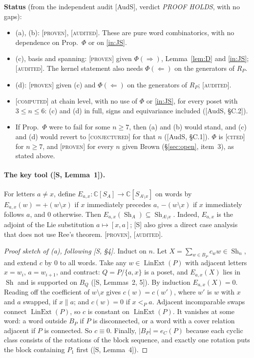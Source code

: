 \documentclass[11pt]{article}
\theoremstyle{definition}
\theoremstyle{remark}
\newcommand{\Lin}{\operatorname{LinExt}}
\newcommand{\Sh}{\operatorname{Sh}}
\newcommand{\st}[1]{\textup{[\textsc{#1}]}}
\begin{document}
\noindent\textbf{Status} (from the independent audit [AudS], verdict
\emph{PROOF HOLDS}, with no gaps):
\begin{itemize}[nosep]
\item (a), (b): \st{proven}, \st{audited}. These are pure word
  combinatorics, with no dependence on Prop.~$\Phi$ or on \ref{in:JS}.
\item (c), basis and spanning: \st{proven} given $\Phi(\Rightarrow)$,
  Lemma~\ref{lem:D} and \ref{in:JS}; \st{audited}. The kernel statement also
  needs $\Phi(\Leftarrow)$ on the generators of $R_P$.
\item (d): \st{proven} given (c) and $\Phi(\Leftarrow)$ on the generators of
  $R_P$; \st{audited}.
\item \st{computed} at chain level, with no use of $\Phi$ or \ref{in:JS},
  for every poset with $3\le n\le6$: (c) and (d) in full, signs and
  equivariance included ([AudS, \S C.2]).
\item If Prop.~$\Phi$ were to fail for some $n\ge7$, then (a) and (b) would
  stand, and (c) and (d) would revert to \st{conjectured} for that $n$
  ([AudS, \S C.1]). $\Phi$ is \st{cited} for $n\ge7$, and \st{proven} for
  every $n$ given Brown (\S\ref{sec:open}, item~3), as stated above.
\end{itemize}

\paragraph{The key tool ([S, Lemma~1]).} For letters $a\ne x$, define
$E_{a,x}:\mathbb C[S_A]\to\mathbb C[S_{A\setminus x}]$ on words by
$E_{a,x}(w)=+(w\setminus x)$ if $x$ immediately precedes $a$,
$-(w\setminus x)$ if $x$ immediately follows $a$, and $0$ otherwise. Then
$E_{a,x}(\Sh_A)\subseteq\Sh_{A\setminus x}$. Indeed, $E_{a,x}$ is the adjoint
of the Lie substitution $a\mapsto[x,a]$; [S] also gives a direct case
analysis that does not use Ree's theorem. \st{proven}, \st{audited}.

\begin{proof}[Proof sketch of (a), following {[S, \S4]}]
Induct on $n$. Let $X=\sum_{w\in B_P}c_ww\in\Sh_n$, and extend $c$ by $0$ to
all words. Take any $w\in\Lin(P)$ with adjacent letters $x=w_i$,
$a=w_{i+1}$, and contract: $Q=P/\{a,x\}$ is a poset, and $E_{a,x}(X)$ lies in
$\Sh$ and is supported on $B_Q$ ([S, Lemmas~2, 5]). By induction
$E_{a,x}(X)=0$. Reading off the coefficient of $w\setminus x$ gives
$c(w)=c(w')$, where $w'$ is $w$ with $x$ and $a$ swapped, if $x\parallel a$;
and $c(w)=0$ if $x<_Pa$. Adjacent incomparable swaps connect $\Lin(P)$, so
$c$ is constant on $\Lin(P)$. It vanishes at some word: a word outside $B_P$
if $P$ is disconnected, or a word with a cover relation adjacent if $P$ is
connected. So $c\equiv0$. Finally, $|B_P|=e_C(P)$ because each cyclic class
consists of the rotations of the block sequence, and exactly one rotation
puts the block containing $P_1$ first ([S, Lemma~4]).
\end{proof}
\end{document}
